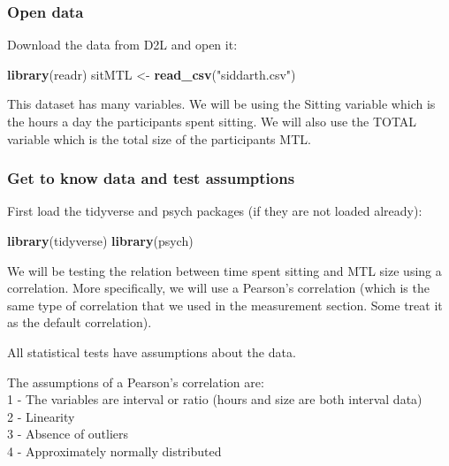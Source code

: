\documentclass[
]{book}
\newenvironment{Shaded}{\begin{snugshade}}{\end{snugshade}}
\newcommand{\KeywordTok}[1]{\textcolor[rgb]{0.13,0.29,0.53}{\textbf{#1}}}
\newcommand{\NormalTok}[1]{#1}
\newcommand{\StringTok}[1]{\textcolor[rgb]{0.31,0.60,0.02}{#1}}
\begin{document}
\hypertarget{open-data}{%
\subsubsection{Open data}\label{open-data}}

Download the data from D2L and open it:

\begin{Shaded}
\begin{Highlighting}[]
\KeywordTok{library}\NormalTok{(readr)}
\NormalTok{sitMTL <-}\StringTok{ }\KeywordTok{read_csv}\NormalTok{(}\StringTok{"siddarth.csv"}\NormalTok{)}
\end{Highlighting}
\end{Shaded}

This dataset has many variables. We will be using the Sitting variable which is the hours a day the participants spent sitting. We will also use the TOTAL variable which is the total size of the participants MTL.

\hypertarget{get-to-know-data-and-test-assumptions}{%
\subsubsection{Get to know data and test assumptions}\label{get-to-know-data-and-test-assumptions}}

First load the tidyverse and psych packages (if they are not loaded already):

\begin{Shaded}
\begin{Highlighting}[]
\KeywordTok{library}\NormalTok{(tidyverse)}
\KeywordTok{library}\NormalTok{(psych)}
\end{Highlighting}
\end{Shaded}

We will be testing the relation between time spent sitting and MTL size using a correlation. More specifically, we will use a Pearson's correlation (which is the same type of correlation that we used in the measurement section. Some treat it as the default correlation).

All statistical tests have assumptions about the data.

The assumptions of a Pearson's correlation are:\\
1 - The variables are interval or ratio (hours and size are both interval data)\\
2 - Linearity\\
3 - Absence of outliers\\
4 - Approximately normally distributed
\end{document}

